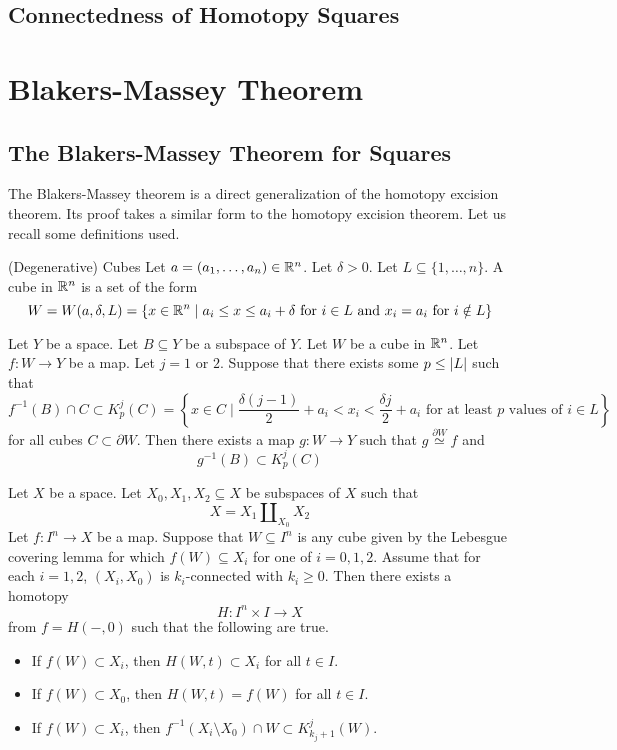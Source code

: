 \documentclass[a4paper]{article}
\begin{document}
\subsection{Connectedness of Homotopy Squares}

\pagebreak
\section{Blakers-Massey Theorem}
\subsection{The Blakers-Massey Theorem for Squares}
The Blakers-Massey theorem is a direct generalization of the homotopy excision theorem. Its proof takes a similar form to the homotopy excision theorem. Let us recall some definitions used. 

\begin{defn}{(Degenerative) Cubes}{} Let $a=(a_1,\dots,a_n)\in\mathbb{R}^n$. Let $\delta>0$. Let $L\subseteq\{1,\dots,n\}$. A cube in $\mathbb{R}^n$ is a set of the form $$W=W(a,\delta,L)=\{x\in\mathbb{R}^n\;|\;a_i\leq x\leq a_i+\delta\text{ for }i\in L\text{ and }x_i=a_i\text{ for }i\notin L\}$$
\end{defn}

\begin{lmm}{}{} Let $Y$ be a space. Let $B\subseteq Y$ be a subspace of $Y$. Let $W$ be a cube in $\mathbb{R}^n$. Let $f:W\to Y$ be a map. Let $j=1$ or $2$. Suppose that there exists some $p\leq\abs{L}$ such that $$f^{-1}(B)\cap C\subset K_p^j(C)=\left\{x\in C\;|\;\frac{\delta(j-1)}{2}+a_i<x_i<\frac{\delta j}{2}+a_i\text{ for at least }p\text{ values of }i\in L\right\}$$ for all cubes $C\subset\partial W$. Then there exists a map $g:W\to Y$ such that $g\overset{\partial W}{\simeq} f$ and $$g^{-1}(B)\subset K_p^j(C)$$
\end{lmm}

\begin{prp}{}{} Let $X$ be a space. Let $X_0,X_1,X_2\subseteq X$ be subspaces of $X$ such that $$X=X_1\amalg_{X_0}X_2$$ Let $f:I^n\to X$ be a map. Suppose that $W\subseteq I^n$ is any cube given by the Lebesgue covering lemma for which $f(W)\subseteq X_i$ for one of $i=0,1,2$. Assume that for each $i=1,2$, $(X_i,X_0)$ is $k_i$-connected with $k_i\geq 0$. Then there exists a homotopy $$H:I^n\times I\to X$$ from $f=H(-,0)$ such that the following are true. 
\begin{itemize}
\item If $f(W)\subset X_i$, then $H(W,t)\subset X_i$ for all $t\in I$. 
\item If $f(W)\subset X_0$, then $H(W,t)=f(W)$ for all $t\in I$. 
\item If $f(W)\subset X_i$, then $f^{-1}(X_i\setminus X_0)\cap W\subset K_{k_j+1}^j(W)$. 
\end{itemize}
\end{prp}
\end{document}
